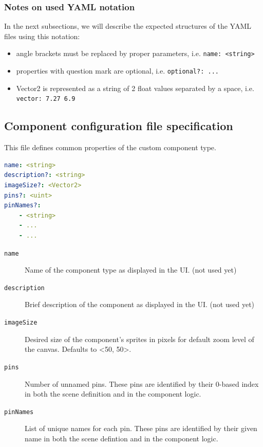 \subsubsection{Notes on used YAML notation} \label{yaml_notation}
In the next subsections, we will describe the expected structures of the YAML files using this notation:
\begin{itemize}
  \item angle brackets must be replaced by proper parameters, i.e. \texttt{name: <string>}
  \item properties with question mark are optional, i.e. \texttt{optional?: ...}
  \item Vector2 is represented as a string of 2 float values separated by a space, i.e. \texttt{vector: 7.27 6.9} 
\end{itemize}

\subsection{Component configuration file specification} \label{subsec:component_spec}
This file defines common properties of the custom component type.

\begin{lstlisting}[language=yaml, caption={YAML configuration file structure}]
name: <string>
description?: <string>
imageSize?: <Vector2>
pins?: <uint>
pinNames?:
    - <string>
    - ...
    - ...
\end{lstlisting}

\begin{description}
    \item[\texttt{name}] Name of the component type as displayed in the UI. (not used yet)
    \item[\texttt{description}] Brief description of the component as displayed in the UI. (not used yet)
    \item[\texttt{imageSize}] Desired size of the component's sprites in pixels for default zoom level of the canvas. Defaults to <50, 50>.
    \item[\texttt{pins}] Number of unnamed pins. These pins are identified by their 0-based index in both the scene definition and in the component logic.
    \item[\texttt{pinNames}] List of unique names for each pin. These pins are identified by their given name in both the scene defintion and in the component logic.
\end{description}



